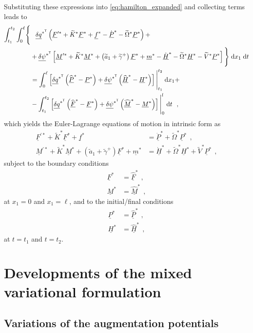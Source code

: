 \documentclass[12pt,a4paper,oneside,english]{abntex2} %
\newcommand{\vect}[1]{\underline{#1}}
\def\til#1{\widetilde{#1}}
\def\lb{\left[}
\def\rb{\right]}
\def\lp{\left(}
\def\rp{\right)}
\def\T{\mathsf{T}}
\def\xo{x_1}
\def\aonetil{\til{a}_1}
\def\gamptil{\til{\gamma}^{+}}
\def\Ktil{\til{K}}
\def\Ktils{\Ktil^{*}}
\def\Vtils{\til{V}^{*}}
\def\Omtil{\til{\Omega}}
\def\Omtils{\Omtil^{*}}
\def\P{\vect{P}}
\def\Ps{\P^*}
\def\Pdots{\dot{\P}^*}
\def\Phats{\widehat{\P}^*}
\def\Hv{\vect{H}}
\def\Hvdot{\dot{\Hv}}
\def\Hvs{\Hv^*}
\def\Hvdots{\Hvdot^*}
\def\Hhats{\widehat{\Hv}^*}
\def\F{\vect{F}}
\def\Fhat{\widehat{\F}}
\def\Fhats{\Fhat^*}
\def\Fs{\F^*}
\def\Fsprime{\F^{\prime*}}
\def\M{\vect{M}}
\def\Mhat{\widehat{\M}}
\def\Mhats{\Mhat^*}
\def\Ms{\M^*}
\def\Msprime{\M^{\prime*}}
\def\f{\vect{f}}
\def\fs{\f^*}
\def\m{\vect{m}}
\def\ms{\m^*}
\def\delq{\vect{\delta q}}
\def\delqsT{\delq^{*^\T}}
\def\delpsi{\vect{\delta\psi}}
\def\delpsisT{\delpsi^{*^\T}}
\def\intt{\int_{t_1}^{t_2}}
\def\intl{\int_{0}^{\ell}}
\def\d{\textnormal{d}}
\begin{document}
\begin{apendicesenv}
Substituting these expressions into \cref{eq:hamilton_expanded} and collecting terms leads to
\begin{equation}
\begin{aligned}
    \intt\intl \Biggl\{\Biggr.&
    \hphantom{+}\delqsT\lp \Fsprime + \Ktils\Fs + \fs - \Pdots - \Omtils\Ps \rp +  
    \nonumber 
    \\
    &+ \delpsisT \lb \Msprime + \Ktils\Ms + \lp\aonetil+\gamptil\rp\Fs + \ms 
	- \Hvdots - \Omtils\Hvs - \Vtils\Ps \rb \Biggl.\Biggr\} \;\d\xo\;\d t \nonumber \\
	&= \intl\lb \delqsT\lp\Phats-\Ps\rp + \delpsisT\lp\Hhats-\Hvs\rp \rb\Bigg|_{t_1}^{t_2} \; \d \xo +
    \nonumber 
    \\
    & -\intt\lb  \delqsT\lp\Fhats-\Fs\rp + \delpsisT\lp\Mhats-\Ms\rp \rb\Bigg|_{0}^{l} \; \d t \ \ ,
    \label{eq:hamilton_expanded2}
\end{aligned}
\end{equation}
which yields the Euler-Lagrange equations of motion in intrinsic form as
\begin{align}
    \Fsprime + \Ktils\Fs + \fs &= \Pdots + \Omtils\Ps \ \ ,
    \label{eq:intrinsic_F}
    \\
    \Msprime + \Ktils\Ms + \lp\aonetil+\gamptil\rp\Fs + \ms 
    &= \Hvdots + \Omtils\Hvs + \Vtils\Ps \ \ ,
    \label{eq:intrinsic_M}
\end{align}
subject to the boundary conditions
\begin{align}
    \Fs &= \Fhats \ \ ,
    \label{eq:boundary_F}
    \\
    \Ms &= \Mhats \ \ ,
    \label{eq:boundary_M}
\end{align}
at $x_1 = 0$ and $x_1 = \ell$, and to the initial/final conditions
\begin{align}
    \Ps &= \Phats \ \ ,
    \label{eq:boundary_P}
    \\
    \Hvs &= \Hhats \ \ ,
    \label{eq:boundary_H}
\end{align}
at $t=t_1$ and $t=t_2$.

\chapter{Developments of the mixed variational formulation}
\label{appendix_mixed}

\section{Variations of the augmentation potentials}


\end{apendicesenv}
\end{document}
